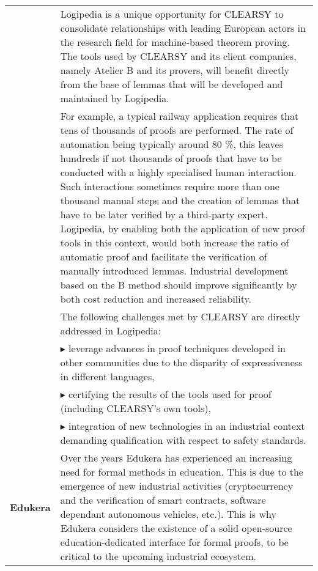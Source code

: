 \begin{longtable*}{|p{0.10\textwidth}|p{0.85\textwidth}|}
&
\hspace{0.4cm}
Logipedia is a unique opportunity for CLEARSY to consolidate relationships with leading European actors in the research field for machine-based
theorem proving. The tools used by CLEARSY and its client companies, namely Atelier B and its provers, will benefit directly from the base of lemmas
that will be developed and maintained by Logipedia.
\\

&
\hspace{0.4cm}
For example, a typical railway application requires that tens of thousands of proofs are performed. The rate of automation being typically around 80 \%,
this leaves hundreds if not thousands of proofs that have to be conducted with a highly specialised human interaction. Such interactions sometimes require
more than one thousand manual steps and the creation of lemmas that have to be later verified by a third-party expert.
Logipedia, by enabling both the application of new proof tools in this context, would both increase the ratio of automatic proof and facilitate the verification
of manually introduced lemmas. Industrial development based on the B method should improve significantly by both cost reduction
and increased reliability.
\\

& The following challenges met by CLEARSY are
directly addressed in Logipedia:\\

& $\blacktriangleright$ leverage advances in proof techniques
developed in other communities due to the disparity of expressiveness
in different languages,\\

& $\blacktriangleright$ certifying the results of the tools used for
proof (including CLEARSY's own tools),\\


& $\blacktriangleright$ integration of new technologies in an
industrial context demanding qualification with respect to safety
standards.  \\

\hline

{\bf Edukera}&

\hspace{0.4cm} Over the years Edukera has experienced an increasing
need for formal methods in education. This is due to the emergence of
new industrial activities (cryptocurrency and the verification of
smart contracts, software dependant autonomous vehicles, etc.). This
is why Edukera considers the existence of a solid open-source
education-dedicated interface for formal proofs, to be critical to the
upcoming industrial ecosystem.\\


\end{longtable*}
